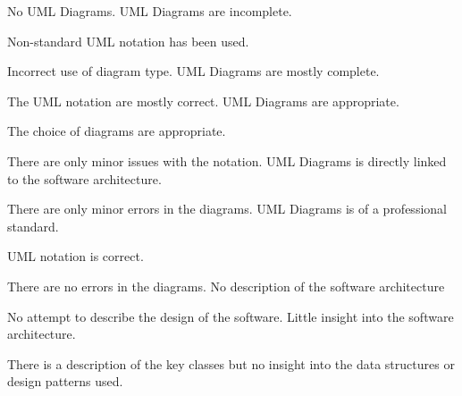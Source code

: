 \documentclass{../../fal_assignment}
\begin{document}
\begin{markingrubric}
		\grade\fail No UML Diagrams.
	\grade UML Diagrams are incomplete.
	\par Non-standard UML notation has been used.
	\par Incorrect use of diagram type.
	\grade UML Diagrams are mostly complete.
	\par The UML notation are mostly correct.
	\grade UML Diagrams are appropriate.
	\par The choice of diagrams are appropriate.
	\par There are only minor issues with the notation.
	\grade UML Diagrams is directly linked to the software architecture.
	\par There are only minor errors in the diagrams.
	\grade UML Diagrams is of a professional standard.
	\par UML notation is correct.
	\par There are no errors in the diagrams.
	\grade\fail No description of the software architecture
	\par No attempt to describe the design of the software.
	\grade Little insight into the software architecture.
	\par There is a description of the key classes but no insight into the data structures or design patterns used.

\end{markingrubric}
\end{document}
